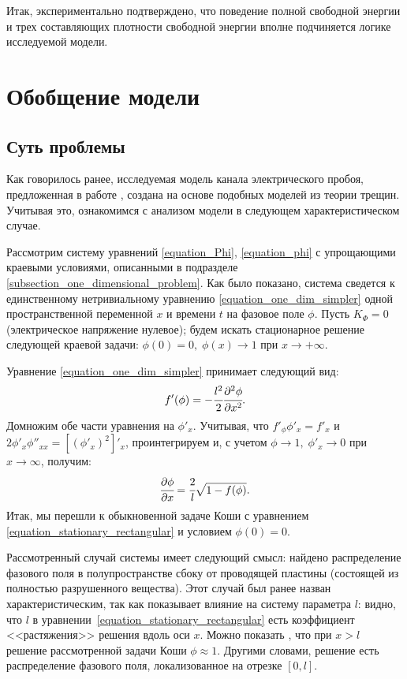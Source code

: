 \documentclass[a4paper,12pt]{article}
\theoremstyle{plain}
\theoremstyle{definition}
\begin{document}
Итак, экспериментально подтверждено, что поведение полной свободной энергии и трех составляющих плотности свободной энергии вполне подчиняется логике исследуемой модели.


\section{Обобщение модели}
\label{section_model_fixing}

\subsection{Суть проблемы}
\label{subsection_matter_of_problem}

Как говорилось ранее, исследуемая модель канала электрического пробоя, предложенная в работе \cite{pitike_dielectric_breakdown}, создана на основе подобных моделей из теории трещин. Учитывая это, ознакомимся с анализом модели в следующем характеристическом случае.

Рассмотрим систему уравнений \eqref{equation_Phi}, \eqref{equation_phi} с упрощающими краевыми условиями, описанными в подразделе \ref{subsection_one_dimensional_problem}. Как было показано, система сведется к единственному нетривиальному уравнению \eqref{equation_one_dim_simpler} одной пространственной переменной $x$ и времени $t$ на фазовое поле $\phi$. Пусть $K_\Phi = 0$ (электрическое напряжение нулевое); будем искать стационарное решение следующей краевой задачи: $\phi(0) = 0, \; \phi(x) \to 1$ при $x \to +\infty$.

Уравнение \eqref{equation_one_dim_simpler} принимает следующий вид:
$$f'(\phi) = - \cfrac{l^2}{2} \cfrac{\partial^2 \phi}{\partial x^2} \text{.}$$
Домножим обе части уравнения на $\phi'_x$. Учитывая, что $f'_\phi \phi'_x = f'_x$ и $2 \phi'_x \phi''_{xx} = [(\phi'_x)^2]'_x$, проинтегрируем и, с учетом $\phi \to 1, \; \phi'_x \to 0$ при $x \to \infty$, получим:
\begin{equation}
    \cfrac{\partial \phi}{\partial x} = \cfrac{2}{l} \sqrt{1 - f(\phi)} \text{.}
    \label{equation_stationary_rectangular}
\end{equation}
Итак, мы перешли к обыкновенной задаче Коши с уравнением \eqref{equation_stationary_rectangular} и условием $\phi(0) = 0$.

Рассмотренный случай системы имеет следующий смысл: найдено распределение фазового поля в полупространстве сбоку от проводящей пластины (состоящей из полностью разрушенного вещества). Этот случай был ранее назван характеристическим, так как показывает влияние на систему параметра $l$: видно, что $l$ в уравнении~\eqref{equation_stationary_rectangular} есть коэффициент <<растяжения>> решения вдоль оси $x$. Можно показать \cite{zipunova_higher_codimension}, что при $x > l$ решение рассмотренной задачи Коши $\phi \approx 1$. Другими словами, решение есть распределение фазового поля, локализованное на отрезке $[0, l]$.
\end{document}

